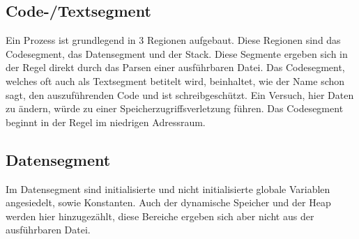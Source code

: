 ﻿\documentclass[12pt]{book}
\begin{document}
\subsection{Code-/Textsegment}
Ein Prozess ist grundlegend in 3 Regionen aufgebaut. Diese Regionen sind das
Codesegment, das Datensegment und der Stack. Diese Segmente ergeben sich in der
Regel direkt durch das Parsen einer ausführbaren Datei. Das Codesegment, welches
oft auch als Textsegment betitelt wird, beinhaltet, wie der Name schon sagt, den
auszuführenden Code und ist schreibgeschützt. Ein Versuch, hier Daten zu ändern,
würde zu einer Speicherzugriffsverletzung führen. Das Codesegment beginnt in der
Regel im niedrigen Adressraum.


\subsection{Datensegment}
Im Datensegment sind initialisierte und nicht initialisierte globale Variablen
angesiedelt, sowie Konstanten. Auch der dynamische Speicher und der Heap werden
hier hinzugezählt, diese Bereiche ergeben sich aber nicht aus der ausführbaren
Datei.
\end{document}
